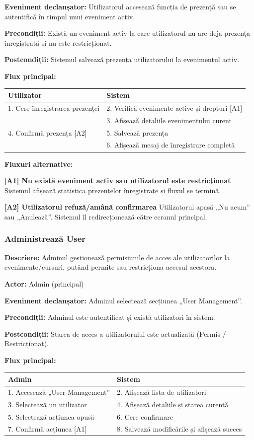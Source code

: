 \documentclass[11pt]{article}
\begin{document}
\textbf{Eveniment declanșator:} Utilizatorul accesează funcția de prezență sau se autentifică în timpul unui eveniment activ.

\textbf{Precondiții:} Există un eveniment activ la care utilizatorul nu are deja prezența înregistrată și nu este restricționat.

\textbf{Postcondiții:} Sistemul salvează prezența utilizatorului la evenimentul activ.

\textbf{Flux principal:}

\begin{tabular}{l l}
\hline
\textbf{Utilizator} & \textbf{Sistem} \\
\hline
1. Cere înregistrarea prezenței & 2. Verifică evenimente active și drepturi [A1] \\
 & 3. Afișează detaliile evenimentului curent \\
4. Confirmă prezența [A2] & 5. Salvează prezența \\
 & 6. Afișează mesaj de înregistrare completă \\
\hline
\end{tabular}

\textbf{Fluxuri alternative:}

\textbf{[A1] Nu există eveniment activ sau utilizatorul este restricționat}  
Sistemul afișează statistica prezențelor înregistrate și fluxul se termină.

\textbf{[A2] Utilizatorul refuză/amână confirmarea}  
Utilizatorul apasă „Nu acum” sau „Anulează”. Sistemul îl redirecționează către ecranul principal.

\subsubsection{Administrează User}


\textbf{Descriere:} Adminul gestionează permisiunile de acces ale utilizatorilor la evenimente/cursuri, putând permite sau restricționa accesul acestora.

\textbf{Actor:} Admin (principal)

\textbf{Eveniment declanșator:} Adminul selectează secțiunea „User Management”.

\textbf{Precondiții:} Adminul este autentificat și există utilizatori în sistem.

\textbf{Postcondiții:} Starea de acces a utilizatorului este actualizată (Permis / Restricționat).

\textbf{Flux principal:}

\begin{tabular}{l l}
\hline
\textbf{Admin} & \textbf{Sistem} \\
\hline
1. Accesează „User Management” & 2. Afișează lista de utilizatori \\
3. Selectează un utilizator & 4. Afișează detaliile și starea curentă \\
5. Selectează acțiunea opusă & 6. Cere confirmare \\
7. Confirmă acțiunea [A1] & 8. Salvează modificările și afișează succes \\
\hline
\end{tabular}
\end{document}
